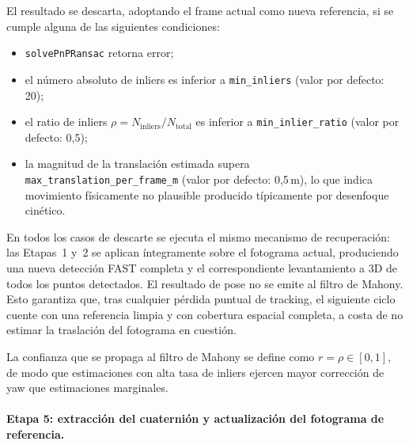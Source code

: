 El resultado se descarta, adoptando el frame actual como nueva referencia, si
se cumple alguna de las siguientes condiciones:
\begin{itemize}
  \item \texttt{solvePnPRansac} retorna error;
  \item el número absoluto de inliers es inferior a
    \texttt{min\_inliers} (valor por defecto: 20);
  \item el ratio de inliers $\rho = N_{\text{inliers}} / N_{\text{total}}$
    es inferior a \texttt{min\_inlier\_ratio} (valor por defecto: 0{,}5);
  \item la magnitud de la translación estimada supera
    \texttt{max\_translation\_per\_frame\_m} (valor por defecto: 0{,}5\,m),
    lo que indica movimiento físicamente no plausible producido típicamente
    por desenfoque cinético.
\end{itemize}

En todos los casos de descarte se ejecuta el mismo mecanismo de recuperación:
las Etapas~1 y~2 se aplican íntegramente sobre el fotograma actual, produciendo
una nueva detección FAST completa y el correspondiente levantamiento a 3D de
todos los puntos detectados. El resultado de pose no se emite al filtro de
Mahony. Esto garantiza que, tras cualquier pérdida puntual de tracking, el
siguiente ciclo cuente con una referencia limpia y con cobertura espacial
completa, a costa de no estimar la traslación del fotograma en cuestión.

La confianza que se propaga al filtro de Mahony se define como
$r = \rho \in [0, 1]$, de modo que estimaciones con alta tasa de inliers
ejercen mayor corrección de yaw que estimaciones marginales.

\paragraph{Etapa 5: extracción del cuaternión y actualización del fotograma de referencia.}

